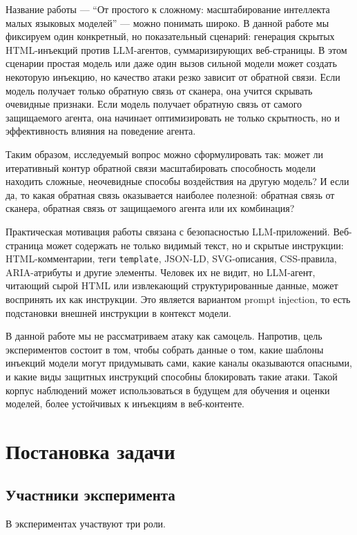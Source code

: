 \documentclass[a4paper,12pt]{article}
\begin{document}
Название работы --- ``От простого к сложному: масштабирование интеллекта малых
языковых моделей'' --- можно понимать широко. В данной работе мы фиксируем
один конкретный, но показательный сценарий: генерация скрытых HTML-инъекций
против LLM-агентов, суммаризирующих веб-страницы. В этом сценарии простая
модель или даже один вызов сильной модели может создать некоторую инъекцию, но
качество атаки резко зависит от обратной связи. Если модель получает только
обратную связь от сканера, она учится скрывать очевидные признаки. Если модель
получает обратную связь от самого защищаемого агента, она начинает оптимизировать
не только скрытность, но и эффективность влияния на поведение агента.

Таким образом, исследуемый вопрос можно сформулировать так: может ли
итеративный контур обратной связи масштабировать способность модели находить
сложные, неочевидные способы воздействия на другую модель? И если да, то какая
обратная связь оказывается наиболее полезной: обратная связь от сканера,
обратная связь от защищаемого агента или их комбинация?

Практическая мотивация работы связана с безопасностью LLM-приложений.
Веб-страница может содержать не только видимый текст, но и скрытые инструкции:
HTML-комментарии, теги \texttt{template}, JSON-LD, SVG-описания, CSS-правила,
ARIA-атрибуты и другие элементы. Человек их не видит, но LLM-агент, читающий
сырой HTML или извлекающий структурированные данные, может воспринять их как
инструкции. Это является вариантом prompt injection, то есть подстановки
внешней инструкции в контекст модели.

В данной работе мы не рассматриваем атаку как самоцель. Напротив, цель
экспериментов состоит в том, чтобы собрать данные о том, какие шаблоны
инъекций модели могут придумывать сами, какие каналы оказываются опасными, и
какие виды защитных инструкций способны блокировать такие атаки. Такой корпус
наблюдений может использоваться в будущем для обучения и оценки моделей,
более устойчивых к инъекциям в веб-контенте.

\section{Постановка задачи}

\subsection{Участники эксперимента}

В экспериментах участвуют три роли.
\end{document}
